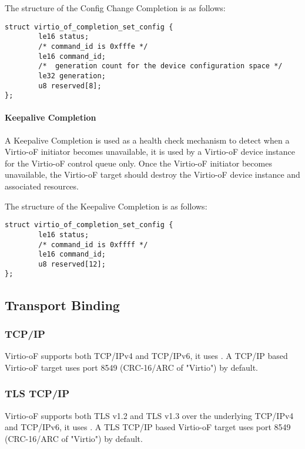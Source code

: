 The structure of the Config Change Completion is as follows:
\begin{lstlisting}
struct virtio_of_completion_set_config {
        le16 status;
        /* command_id is 0xfffe */
        le16 command_id;
        /*  generation count for the device configuration space */
        le32 generation;
        u8 reserved[8];
};
\end{lstlisting}

\paragraph{Keepalive Completion}\label{sec:Virtio Transport Options / Virtio Over Fabrics / Commands Definition / Opcodes / Keepalive Completion}
A Keepalive Completion is used as a health check mechanism to detect when a Virtio-oF initiator becomes unavailable, it is used by a Virtio-oF device instance for the Virtio-oF control queue only.
Once the Virtio-oF initiator becomes unavailable, the Virtio-oF target should destroy the Virtio-oF device instance and associated resources.

The structure of the Keepalive Completion is as follows:
\begin{lstlisting}
struct virtio_of_completion_set_config {
        le16 status;
        /* command_id is 0xffff */
        le16 command_id;
        u8 reserved[12];
};
\end{lstlisting}


\subsection{Transport Binding}\label{sec:Virtio Transport Options / Virtio Over Fabrics / Transport Binding}

\subsubsection{TCP/IP}\label{sec:Virtio Transport Options / Virtio Over Fabrics / Transport Binding / TCP IP}
Virtio-oF supports both TCP/IPv4 and TCP/IPv6, it uses
.
A TCP/IP based Virtio-oF target uses port 8549 (CRC-16/ARC of "Virtio") by default.

\subsubsection{TLS TCP/IP}\label{sec:Virtio Transport Options / Virtio Over Fabrics / Transport Binding / TLS TCP IP}
Virtio-oF supports both TLS v1.2 and TLS v1.3 over the underlying TCP/IPv4 and TCP/IPv6, it uses
.
A TLS TCP/IP based Virtio-oF target uses port 8549 (CRC-16/ARC of "Virtio") by default.

